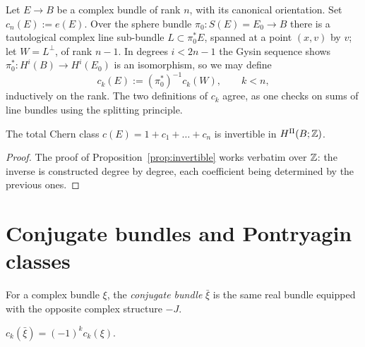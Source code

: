 \begin{construction}
Let $E\to B$ be a complex bundle of rank $n$, with its canonical orientation.
Set $c_n(E):=e(E)$. Over the sphere bundle $\pi_0\colon S(E)=E_0\to B$ there is
a tautological complex line sub-bundle $L\subset\pi_0^*E$, spanned at a point
$(x,v)$ by $v$; let $W=L^{\perp}$, of rank $n-1$. In degrees $i<2n-1$ the Gysin
sequence shows $\pi_0^*\colon H^i(B)\to H^i(E_0)$ is an isomorphism, so we may
define
\[
c_k(E):=(\pi_0^*)^{-1}c_k(W),\qquad k<n,
\]
inductively on the rank. The two definitions of $c_k$ agree, as one checks on
sums of line bundles using the splitting principle.
\end{construction}

\begin{proposition}
The total Chern class $c(E)=1+c_1+\dots+c_n$ is invertible in $H^\Pi(B;\mathbb{Z})$.
\end{proposition}

\begin{proof}
The proof of Proposition~\ref{prop:invertible} works verbatim over $\mathbb{Z}$: the
inverse is constructed degree by degree, each coefficient being determined by
the previous ones.
\end{proof}

\section{Conjugate bundles and Pontryagin classes}

\begin{definition}
For a complex bundle $\xi$, the \emph{conjugate bundle} $\bar\xi$ is the same
real bundle equipped with the opposite complex structure $-J$.
\end{definition}

\begin{proposition}\label{prop:conjugate}
$c_k(\bar\xi)=(-1)^k c_k(\xi)$.
\end{proposition}


